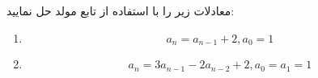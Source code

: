     \p 
معادلات زیر را با استفاده از تابع مولد حل نمایید:
\begin{enumerate}
\item
$$a_n = a_{n-1} + 2, a_0 = 1$$
\item
$$a_n = 3a_{n-1} - 2a_{n-2} + 2, a_0 = a_1 = 1$$
\end{enumerate}